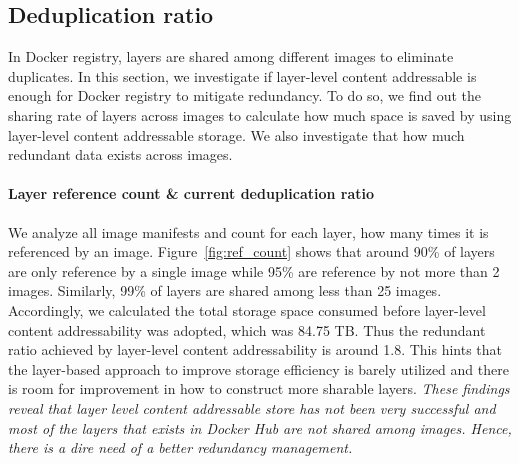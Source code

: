 \subsection{Deduplication ratio}
\label{sec:dedup_ratio}



In Docker registry, layers are shared among different images to eliminate duplicates.
In this section, we investigate if layer-level content addressable is enough for Docker
registry to mitigate redundancy.
To do so, we find out the sharing rate of layers across images to calculate
how much space is saved by using layer-level content addressable storage.
We also investigate that how much redundant data exists across images.

\paragraph{Layer reference count \& current deduplication ratio}



We analyze all image manifests and count for each layer, how many times it is
referenced by an image.
%
Figure~\ref{fig:ref_count} shows that around 90\% of layers are only reference
by a single image while 95\% are reference by not more than 2 images.
%
Similarly, 99\% of layers are shared among less than 25 images. 
%
Accordingly, we calculated the total storage space consumed before layer-level content addressability was adopted, which was 84.75 TB. 
Thus the redundant ratio achieved by layer-level content addressability is around 1.8.
%
This hints that the layer-based approach to improve storage efficiency is
barely utilized and there is room for improvement in how to construct more
sharable layers.
%
\emph{These findings reveal that layer level content addressable store has not been very successful
	and most of the layers that exists in Docker Hub are not shared among images.
	Hence, there is a dire need of a better redundancy management.}

